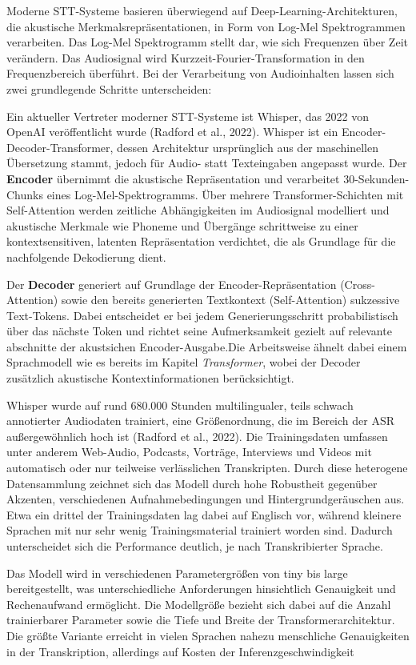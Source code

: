 Moderne STT-Systeme basieren überwiegend auf Deep-Learning-Architekturen, die akustische Merkmalsrepräsentationen, in Form von Log-Mel Spektrogrammen verarbeiten. Das Log-Mel Spektrogramm stellt dar, wie sich Frequenzen über Zeit verändern. Das Audiosignal wird Kurzzeit-Fourier-Transformation in den Frequenzbereich überführt. 
Bei der Verarbeitung von Audioinhalten lassen sich zwei grundlegende Schritte unterscheiden:

Ein aktueller Vertreter moderner STT-Systeme ist Whisper, das 2022 von OpenAI veröffentlicht wurde (Radford et al., 2022). Whisper ist ein Encoder-Decoder-Transformer, dessen Architektur ursprünglich aus der maschinellen Übersetzung stammt, jedoch für Audio- statt Texteingaben angepasst wurde. Der \textbf{Encoder} übernimmt die akustische Repräsentation und verarbeitet 30-Sekunden-Chunks eines Log-Mel-Spektrogramms. Über mehrere Transformer-Schichten mit Self-Attention werden zeitliche Abhängigkeiten im Audiosignal modelliert und akustische Merkmale wie Phoneme und Übergänge schrittweise zu einer kontextsensitiven, latenten Repräsentation verdichtet, die als Grundlage für die nachfolgende Dekodierung dient.  

Der \textbf{Decoder} generiert auf Grundlage der Encoder-Repräsentation (Cross-Attention) sowie den bereits generierten Textkontext (Self-Attention) sukzessive Text-Tokens. Dabei entscheidet er bei jedem Generierungsschritt probabilistisch über das nächste Token und richtet seine Aufmerksamkeit gezielt auf relevante abschnitte der akustsichen Encoder-Ausgabe.Die Arbeitsweise ähnelt dabei einem Sprachmodell wie es bereits im Kapitel \textit{Transformer}, wobei der Decoder zusätzlich akustische Kontextinformationen berücksichtigt.

Whisper wurde auf rund 680.000 Stunden multilingualer, teils schwach annotierter Audiodaten trainiert, eine Größenordnung, die im Bereich der ASR außergewöhnlich hoch ist (Radford et al., 2022). Die Trainingsdaten umfassen unter anderem Web-Audio, Podcasts, Vorträge, Interviews und Videos mit automatisch oder nur teilweise verlässlichen Transkripten. Durch diese heterogene Datensammlung zeichnet sich das Modell durch hohe Robustheit gegenüber Akzenten, verschiedenen Aufnahmebedingungen und Hintergrundgeräuschen aus. Etwa ein drittel der Trainingsdaten lag dabei auf Englisch vor, während kleinere Sprachen mit nur sehr wenig Trainingsmaterial trainiert worden sind. Dadurch unterscheidet sich die Performance deutlich, je nach Transkribierter Sprache. 

Das Modell wird in verschiedenen Parametergrößen von tiny bis large bereitgestellt, was unterschiedliche Anforderungen hinsichtlich Genauigkeit und Rechenaufwand ermöglicht. Die Modellgröße bezieht sich dabei auf die Anzahl trainierbarer Parameter sowie die Tiefe und Breite der Transformerarchitektur. Die größte Variante erreicht in vielen Sprachen nahezu menschliche Genauigkeiten in der Transkription, allerdings auf Kosten der Inferenzgeschwindigkeit

